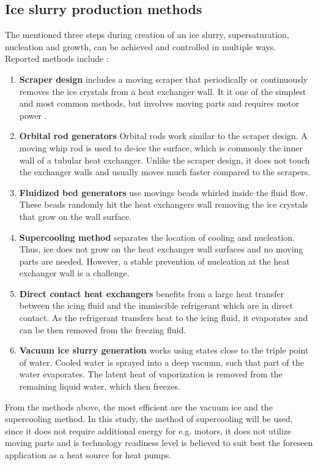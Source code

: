 \subsection{Ice slurry production methods}

The mentioned three steps during creation of an ice slurry, supersaturation, nucleation and growth, can be achieved and controlled in multiple ways. Reported methods include \citep{kauffeld_handbooks_2005, zhang_overview_2012, mouneer_heat_2010}:
\begin{enumerate}
  \item \textbf{Scraper design} includes a moving scraper that periodically or continuously removes the ice crystals from a heat exchanger wall. It it one of the simplest and most common methods, but involves moving parts and requires motor power \citep{ernst_influence_2016}. 
  \item \textbf{Orbital rod generators}
    Orbital rods work similar to the scraper design. A moving whip rod is used to de-ice the surface, which is commonly the inner wall of a tubular heat exchanger. Unlike the scraper design, it does not touch the exchanger walls and usually moves much faster compared to the scrapers.
  \item \textbf{Fluidized bed generators}
    use movings beads whirled inside the fluid flow. These beads randomly hit the heat exchangers wall removing the ice crystals that grow on the wall surface.
  \item \textbf{Supercooling method} separates the location of cooling and nucleation. Thus, ice does not grow on the heat exchanger wall surfaces and no moving parts are needed. However, a stable prevention of nucleation at the heat exchanger wall is a challenge.
  \item \textbf{Direct contact heat exchangers} benefits from a large heat transfer between the icing fluid and the immiscible refrigerant which are in direct contact. As the refrigerant transfers heat to the icing fluid, it evaporates and can be then removed from the freezing fluid.
  \item \textbf{Vacuum ice slurry generation} works using states close to the triple point of water. Cooled water is sprayed into a deep vacuum, such that part of the water evaporates. The latent heat of vaporization is removed from the remaining liquid water, which then freezes. 
\end{enumerate}

From the methods above, the most efficient are the vacuum ice and the supercooling method. In this study, the method of supercooling will be used, since it does not require additional energy for e.g. motors, it does not utilize moving parts and is technology readiness level is believed to suit best the foreseen application as a heat source for heat pumps.


